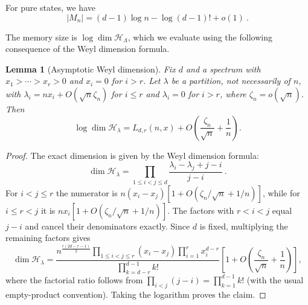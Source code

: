 \documentclass[a4paper,onecolumn,11pt]{quantumarticle}
\newtheorem{lem}{Lemma}
\def\h{\mathcal{H}}
\begin{document}
For pure states, we have
\begin{equation}\label{eq:achievable_pure}
    |M_n|=(d-1)\log n -\log (d-1)!+ o(1)\ .
\end{equation}

The memory size is $\log\dim\h_{\Lambda}$, which we evaluate
using the following consequence of the Weyl dimension formula.

\begin{lem}[Asymptotic Weyl dimension]\label{lem:weyl_asymptotic}
Fix $d$ and a spectrum with $x_1>\cdots>x_r>0$ and $x_i=0$ for
$i>r$. Let $\lambda$ be a partition, not necessarily of $n$, with
$\lambda_i=nx_i+O(\sqrt n\zeta_n)$ for $i\le r$ and
$\lambda_i=0$ for $i>r$, where $\zeta_n=o(\sqrt n)$. Then
\begin{equation}
\log\dim\h_\lambda
=L_{d,r}(n,x)+O\!\left(\frac{\zeta_n}{\sqrt n}+\frac1n\right).
\end{equation}
\end{lem}
\begin{proof}
The exact dimension is given by the Weyl dimension formula:
\begin{equation}\label{eq:weyl_dim}
    \dim \h_\lambda = \prod_{1 \le i < j \le d} \frac{\lambda_i - \lambda_j + j - i}{j - i} \ .
\end{equation}
For $i<j\le r$ the numerator is
$n(x_i-x_j)[1+O(\zeta_n/\sqrt n+1/n)]$, while for
$i\le r<j$ it is $nx_i[1+O(\zeta_n/\sqrt n+1/n)]$.
The factors with $r<i<j$ equal $j-i$ and cancel their denominators exactly. Since $d$ is fixed, multiplying the remaining factors gives
\begin{equation}
\dim\h_\lambda
=\frac{
n^{\frac{r(2d-r-1)}2}
\displaystyle\prod_{1\le i<j\le r}(x_i-x_j)
\displaystyle\prod_{i=1}^r x_i^{d-r}}
{\displaystyle\prod_{k=d-r}^{d-1}k!}
\left[1+O\!\left(\frac{\zeta_n}{\sqrt n}+\frac1n\right)\right],
\end{equation}
where the factorial ratio follows from
$\prod_{i<j}(j-i)=\prod_{k=1}^{d-1}k!$ (with the usual empty-product convention). Taking the logarithm proves the claim.
\end{proof}
\end{document}
